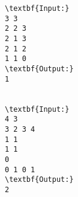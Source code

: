 \begin{verbatim}
\textbf{Input:}
3 3
2 2 3
2 1 3
2 1 2
1 1 0
\textbf{Output:}
1


\textbf{Input:}
4 3
3 2 3 4
1 1
1 1
0
0 1 0 1
\textbf{Output:}
2

\end{verbatim}
